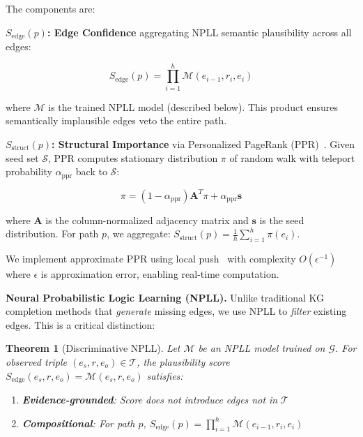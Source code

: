 \documentclass[10pt,twocolumn]{article}
\newtheorem{theorem}{Theorem}
\begin{document}
The components are:

\textbf{$S_{\text{edge}}(p)$: Edge Confidence} aggregating NPLL semantic plausibility across all edges:

\begin{equation}
S_{\text{edge}}(p) = \prod_{i=1}^{h} \mathcal{M}(e_{i-1}, r_i, e_i)
\end{equation}

where $\mathcal{M}$ is the trained NPLL model (described below). This product ensures semantically implausible edges veto the entire path.

\textbf{$S_{\text{struct}}(p)$: Structural Importance} via Personalized PageRank (PPR)~\cite{haveliwala2002topic}. Given seed set $\mathcal{S}$, PPR computes stationary distribution $\pi$ of random walk with teleport probability $\alpha_{\text{ppr}}$ back to $\mathcal{S}$:

\begin{equation}
\pi = (1 - \alpha_{\text{ppr}}) \mathbf{A}^T \pi + \alpha_{\text{ppr}} \mathbf{s}
\end{equation}

where $\mathbf{A}$ is the column-normalized adjacency matrix and $\mathbf{s}$ is the seed distribution. For path $p$, we aggregate: $S_{\text{struct}}(p) = \frac{1}{h} \sum_{i=1}^{h} \pi(e_i)$.

We implement approximate PPR using local push~\cite{andersen2006local} with complexity $O(\epsilon^{-1})$ where $\epsilon$ is approximation error, enabling real-time computation.

\textbf{Neural Probabilistic Logic Learning (NPLL).} Unlike traditional KG completion methods that \textit{generate} missing edges, we use NPLL to \textit{filter} existing edges. This is a critical distinction:

\begin{theorem}[Discriminative NPLL]
Let $\mathcal{M}$ be an NPLL model trained on $\mathcal{G}$. For observed triple $(e_s, r, e_o) \in \mathcal{T}$, the plausibility score $S_{\text{edge}}(e_s, r, e_o) = \mathcal{M}(e_s, r, e_o)$ satisfies:
\begin{enumerate}
\item \textbf{Evidence-grounded}: Score does not introduce edges not in $\mathcal{T}$
\item \textbf{Compositional}: For path $p$, $S_{\text{edge}}(p) = \prod_{i=1}^{h} \mathcal{M}(e_{i-1}, r_i, e_i)$
\end{enumerate}
\end{theorem}
\end{document}
